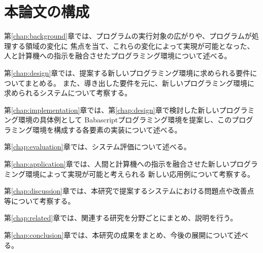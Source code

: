\section{本論文の構成}\label{ux672cux8ad6ux6587ux306eux69cbux6210}

第\ref{chap:background}章では、プログラムの実行対象の広がりや、プログラムが処理する領域の変化に
焦点を当て、これらの変化によって実現が可能となった、人と計算機への指示を融合させたプログラミング環境について述べる。

第\ref{chap:design}章では、提案する新しいプログラミング環境に求められる要件についてまとめる。
また、導き出した要件を元に、新しいプログラミング環境に求められるシステムについて考察する。

第\ref{chap:implementation}章では、第\ref{chap:design}章で検討した新しいプログラミング環境の具体例として
Babascriptプログラミング環境を提案し、このプログラミング環境を構成する各要素の実装について述べる。

第\ref{chap:evaluation}章では、システム評価について述べる。

第\ref{chap:application}章では、人間と計算機への指示を融合させた新しいプログラミング環境によって実現が可能と考えられる
新しい応用例について考察する。

第\ref{chap:discussion}章では、本研究で提案するシステムにおける問題点や改善点等について考察する。

第\ref{chap:related}章では、関連する研究を分野ごとにまとめ、説明を行う。

第\ref{chap:conclusion}章では、本研究の成果をまとめ、今後の展開について述べる。
